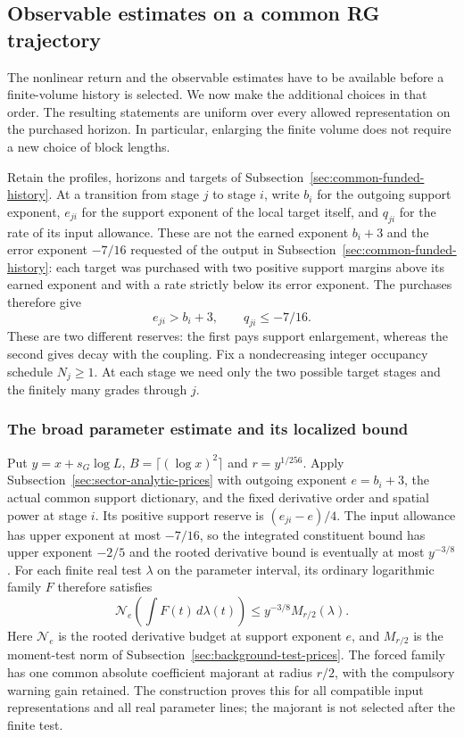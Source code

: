 \subsection{Observable estimates on a common RG trajectory}
\label{sec:common-observable-purchases}
The nonlinear return and the observable estimates have to be available
before a finite-volume history is selected. We now make the additional
choices in that order. The resulting statements are uniform over every
allowed representation on the purchased horizon. In particular, enlarging
the finite volume does not require a new choice of block lengths.

Retain the profiles, horizons and targets of
Subsection~\ref{sec:common-funded-history}. At a transition from stage $j$
to stage $i$, write $b_i$ for the outgoing support exponent, $e_{ji}$
for the support exponent of the local target itself, and $q_{ji}$ for
the rate of its input allowance. These are not the earned exponent
$b_i+3$ and the error exponent $-7/16$ requested of the output in
Subsection~\ref{sec:common-funded-history}: each target was purchased with
two positive support margins above its earned exponent and with a rate
strictly below its error exponent. The purchases therefore give
\[
             e_{ji}>b_i+3,\qquad q_{ji}\le-7/16.
\]
These are two different reserves: the first pays support enlargement,
whereas the second gives decay with the coupling. Fix a nondecreasing
integer occupancy schedule $N_j\ge1$. At each stage we need only the
two possible target stages and the finitely many grades through $j$.

\subsubsection{The broad parameter estimate and its localized bound}
Put $y=x+s_G\log L$, $B=\lceil(\log x)^2\rceil$ and
$r=y^{1/256}$. Apply Subsection~\ref{sec:sector-analytic-prices} with
outgoing exponent $e=b_i+3$, the actual common support dictionary,
and the fixed derivative order and spatial power at stage $i$.
Its positive support reserve is $(e_{ji}-e)/4$.
The input allowance has upper exponent at most $-7/16$, so the
integrated constituent bound has upper exponent $-2/5$ and the
rooted derivative bound is eventually at most $y^{-3/8}$.
For each finite real test $\lambda$ on the parameter interval, its
ordinary logarithmic family $F$ therefore satisfies
\[
 \mathcal N_e\left(\int F(t)\,d\lambda(t)\right)
       \le y^{-3/8}M_{r/2}(\lambda).
\]
Here $\mathcal N_e$ is the rooted derivative budget at support
exponent $e$, and $M_{r/2}$ is the moment-test norm of
Subsection~\ref{sec:background-test-prices}. The forced family has
one common absolute coefficient majorant at radius $r/2$, with the
compulsory warning gain retained. The construction proves this for
all compatible input representations and all real parameter lines;
the majorant is not selected after the finite test.


